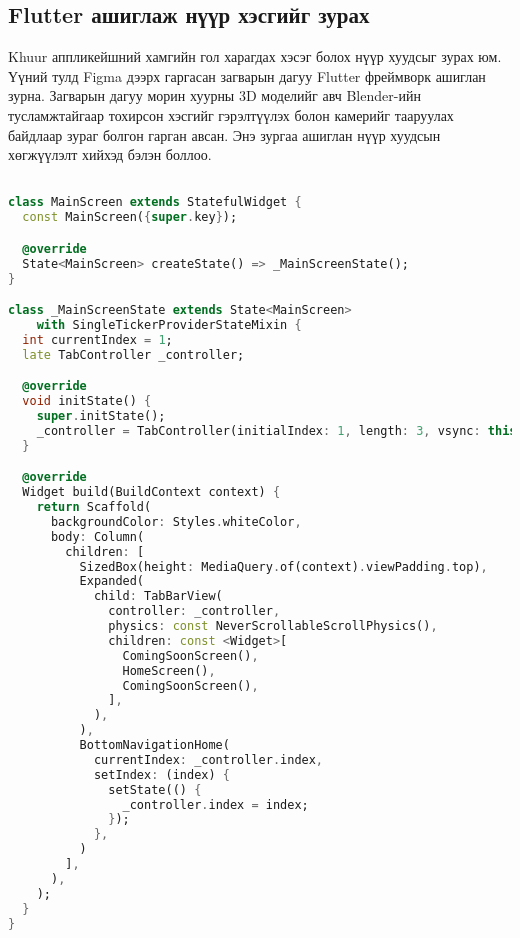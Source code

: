 \subsection{Flutter ашиглаж нүүр хэсгийг зурах}
Khuur аппликейшний хамгийн гол харагдах хэсэг болох нүүр хуудсыг зурах юм. Үүний тулд Figma дээрх гаргасан загварын дагуу Flutter фреймворк ашиглан зурна. Загварын дагуу морин хуурны 3D моделийг авч Blender-ийн тусламжтайгаар тохирсон хэсгийг гэрэлтүүлэх болон камерийг тааруулах байдлаар зураг болгон гарган авсан. Энэ зургаа ашиглан нүүр хуудсын хөгжүүлэлт хийхэд бэлэн боллоо.
\begin{lstlisting}[language=Dart, caption=Нүүр хуудсыг агуулагч виджет-ийн хэрэгжүүлэлт, frame=single]

class MainScreen extends StatefulWidget {
  const MainScreen({super.key});

  @override
  State<MainScreen> createState() => _MainScreenState();
}

class _MainScreenState extends State<MainScreen>
    with SingleTickerProviderStateMixin {
  int currentIndex = 1;
  late TabController _controller;

  @override
  void initState() {
    super.initState();
    _controller = TabController(initialIndex: 1, length: 3, vsync: this);
  }

  @override
  Widget build(BuildContext context) {
    return Scaffold(
      backgroundColor: Styles.whiteColor,
      body: Column(
        children: [
          SizedBox(height: MediaQuery.of(context).viewPadding.top),
          Expanded(
            child: TabBarView(
              controller: _controller,
              physics: const NeverScrollableScrollPhysics(),
              children: const <Widget>[
                ComingSoonScreen(),
                HomeScreen(),
                ComingSoonScreen(),
              ],
            ),
          ),
          BottomNavigationHome(
            currentIndex: _controller.index,
            setIndex: (index) {
              setState(() {
                _controller.index = index;
              });
            },
          )
        ],
      ),
    );
  }
}

\end{lstlisting}

